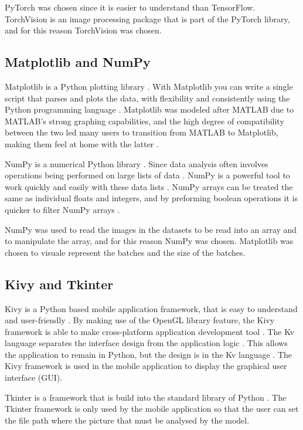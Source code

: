 \documentclass[conference]{IEEEtran}
\begin{document}
PyTorch was chosen since it is easier to understand than TensorFlow. TorchVision is an image processing package that is part of the PyTorch library, and for this reason TorchVision was chosen.

\subsection{Matplotlib and NumPy}

Matplotlib is a Python plotting library \cite{b8}. With Matplotlib you can write a single script that parses and plots the data, with flexibility and consistently using the Python programming language \cite{b12}. Matplotlib was modeled after MATLAB due to MATLAB's strong graphing capabilities, and the high degree of compatibility between the two led many users to transition from MATLAB to Matplotlib, making them feel at home with the latter \cite{b12}.

NumPy is a numerical Python library \cite{b8}. Since data analysis often involves operations being performed on large lists of data \cite{b8}. NumPy is a powerful tool to work quickly and easily with these data lists \cite{b8}. NumPy arrays can be treated the same as individual floats and integers, and by preforming boolean operations it is quicker to filter NumPy arrays \cite{b8}.

NumPy was used to read the images in the datasets to be read into an array and to manipulate the array, and for this reason NumPy was chosen. Matplotlib was chosen to visuale represent the batches and the size of the batches.

\subsection{Kivy and Tkinter}

Kivy is a Python based mobile application framework, that is easy to understand and user-friendly \cite{b13}. By making use of the OpenGL library feature, the Kivy framework is able to make cross-platform application development tool \cite{b13}. The Kv language separates the interface design from the application logic \cite{b14}. This allows the application to remain in Python, but the design is in the Kv language \cite{b14}. The Kivy framework is used in the mobile application to display the graphical user interface (GUI).

Tkinter is a framework that is build into the standard library of Python \cite{b15}. The Tkinter framework is only used by the mobile application so that the user can set the file path where the picture that must be analysed by the model.
\end{document}
